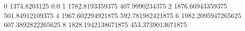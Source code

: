 0 1374.8203125 0.0
1 1782.8193359375 407.9990234375
2 1876.66943359375 501.84912109375
4 1967.602294921875 592.781982421875
6 1982.2095947265625 607.3892822265625
8 1828.1942138671875 453.3739013671875
